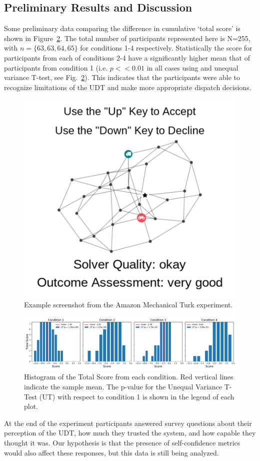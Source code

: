 \subsection{Preliminary Results and Discussion}
Some preliminary data comparing the difference in cumulative `total score' is shown in Figure~\ref{fig:total_score}. The total number of participants represented here is N=255, with $n=\{63,63,64,65\}$ for conditions 1-4 respectively. Statistically the score for participants from each of conditions 2-4 have a significantly higher mean that of participants from condition 1 (i.e. $p<<0.01$ in all cases using and unequal variance T-test, see Fig.~\ref{fig:total_score}). This indicates that the participants were able to recognize limitations of the UDT and make more appropriate dispatch decisions. 

\begin{figure}[tbp]
    \centering
    \includegraphics[width=0.45\linewidth]{Figures/experiment_screenshot_Compressed.png}
    \caption{Example screenshot from the Amazon Mechanical Turk experiment.} 
    \label{fig:experiment_screenshot}
\end{figure}

\begin{figure}[tbp]
    \centering
    \includegraphics[width=1.0\linewidth]{Figures/total_score.pdf}
    \caption{Histogram of the Total Score from each condition. Red vertical lines indicate the sample mean. The p-value for the Unequal Variance T-Test (UT) with respect to condition 1 is shown in the legend of each plot.}
    \label{fig:total_score}
\end{figure}

At the end of the experiment participants answered survey questions about their perception of the UDT, how much they trusted the system, and how capable they thought it was. Our hypothesis is that the presence of self-confidence metrics would also affect these responses, but this data is still being analyzed.

